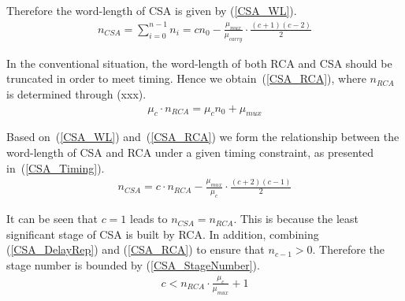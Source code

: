 \documentclass[journal]{IEEEtran}
\begin{document}
Therefore the word-length of CSA is given by (\ref{CSA_WL}).
\begin{eqnarray}\label{CSA_WL}
  n_{CSA}=\sum_{i=0}^{n-1}n_{i}=cn_{0}-\frac{\mu_{mux}}{\mu_{carry}}\cdot\frac{(c+1)(c-2)}{2}
\end{eqnarray}

In the conventional situation, the word-length of both RCA and CSA should be truncated in order to meet timing. Hence we obtain~(\ref{CSA_RCA}), where $n_{RCA}$ is determined through (xxx).
\begin{eqnarray}\label{CSA_RCA}
  \mu_{c}\cdot n_{RCA}=\mu_{c}n_0+\mu_{mux}
\end{eqnarray}

Based on~(\ref{CSA_WL}) and~(\ref{CSA_RCA}) we form the relationship between the word-length of CSA and RCA under a given timing constraint, as presented in~(\ref{CSA_Timing}).
\begin{eqnarray}\label{CSA_Timing}
  n_{CSA}=c\cdot n_{RCA}-\frac{\mu_{mux}}{\mu_{c}}\cdot\frac{(c+2)(c-1)}{2}
\end{eqnarray}

It can be seen that $c=1$ leads to $n_{CSA}=n_{RCA}$. This is because the least significant stage of CSA is built by RCA. In addition, combining (\ref{CSA_DelayRep}) and (\ref{CSA_RCA}) to ensure that $n_{c-1}>0$. Therefore the stage number is bounded by (\ref{CSA_StageNumber}).
\begin{eqnarray}\label{CSA_StageNumber}
  c<n_{RCA}\cdot\frac{\mu_c}{\mu_{mux}}+1
\end{eqnarray}
\end{document}
